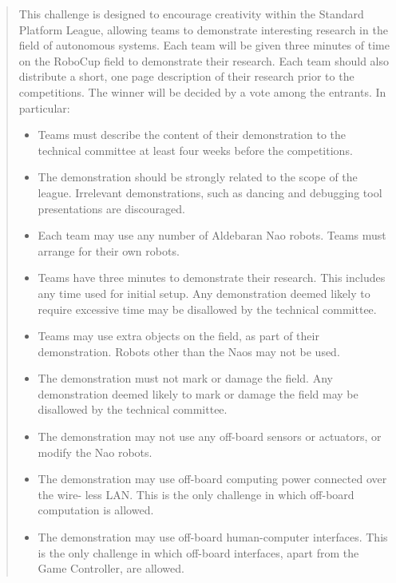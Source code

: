 \documentclass[pdftex,11pt,a4paper]{report}
\begin{document}
\begin{quotation}
This challenge is designed to encourage creativity within the Standard Platform League,
allowing teams to demonstrate interesting research in the field of autonomous systems.
Each team will be given three minutes of time on the RoboCup field to demonstrate
their research. Each team should also distribute a short, one page description of their
research prior to the competitions. The winner will be decided by a vote among the
entrants. In particular:
\begin{itemize}
    \item Teams must describe the content of their demonstration to the
        technical committee at least four weeks before the competitions.
    \item The demonstration should be strongly related to the scope of the
        league. Irrelevant demonstrations, such as dancing and debugging
        tool presentations are discouraged.  
    \item Each team may use any number of Aldebaran Nao robots. Teams must
        arrange for their own robots.  
    \item Teams have three minutes to demonstrate their research. This
        includes any time used for initial setup. Any demonstration deemed
        likely to require excessive time may be disallowed by the technical
        committee.  
    \item Teams may use extra objects on the field, as part of their
        demonstration. Robots other than the Naos may not be used.  
    \item The demonstration must not mark or damage the field. Any
        demonstration deemed likely to mark or damage the field may be
        disallowed by the technical committee.
    \item The demonstration may not use any off-board sensors or actuators,
        or modify the Nao robots.  
    \item The demonstration may use off-board computing power connected
        over the wire- less LAN. This is the only challenge in which
        off-board computation is allowed.
    \item The demonstration may use off-board human-computer interfaces.
        This is the only challenge in which off-board interfaces, apart
        from the Game Controller, are allowed.
\end{itemize}

\end{quotation}
\end{document}
